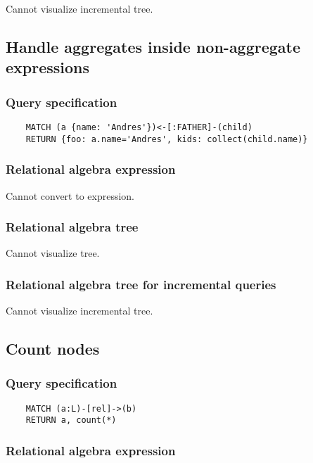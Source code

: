 	Cannot visualize incremental tree.
	\subsection{Handle aggregates inside non-aggregate expressions}

	\subsubsection*{Query specification}

	\begin{lstlisting}
	MATCH (a {name: 'Andres'})<-[:FATHER]-(child)
	RETURN {foo: a.name='Andres', kids: collect(child.name)}
	\end{lstlisting}


	\subsubsection*{Relational algebra expression}

	Cannot convert to expression.

	\subsubsection*{Relational algebra tree}

	Cannot visualize tree.

	\subsubsection*{Relational algebra tree for incremental queries}

	Cannot visualize incremental tree.
	\subsection{Count nodes}

	\subsubsection*{Query specification}

	\begin{lstlisting}
	MATCH (a:L)-[rel]->(b)
	RETURN a, count(*)
	\end{lstlisting}


	\subsubsection*{Relational algebra expression}

